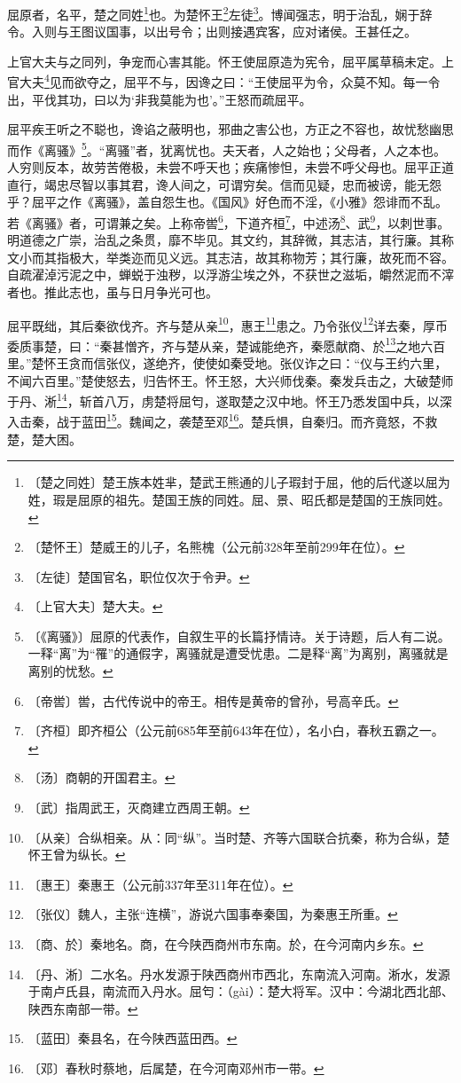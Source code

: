 \documentclass[12pt,UTF-8,openany,a4]{ctexbook}
\begin{document}
\begin{large}
    
    屈原者，名平，楚之同姓\footnote{〔楚之同姓〕\yiwen 楚王族本姓芈，楚武王熊通的儿子瑕封于屈，他的后代遂以屈为姓，瑕是屈原的祖先。楚国王族的同姓。屈、景、昭氏都是楚国的王族同姓。}也。为楚怀王\footnote{〔楚怀王〕\yiwen 楚威王的儿子，名熊槐（公元前328年至前299年在位）。}左徒\footnote{〔左徒〕\yiwen 楚国官名，职位仅次于令尹。}。博闻强志，明于治乱，娴于辞令。入则与王图议国事，以出号令；出则接遇宾客，应对诸侯。王甚任之。
    
    上官大夫与之同列，争宠而心害其能。怀王使屈原造为宪令，屈平属草稿未定。上官大夫\footnote{〔上官大夫〕\yiwen 楚大夫。}见而欲夺之，屈平不与，因谗之曰：“王使屈平为令，众莫不知。每一令出，平伐其功，曰以为‘非我莫能为也’。”王怒而疏屈平。
    
    屈平疾王听之不聪也，谗谄之蔽明也，邪曲之害公也，方正之不容也，故忧愁幽思而作《离骚》\footnote{〔《离骚》〕\yiwen 屈原的代表作，自叙生平的长篇抒情诗。关于诗题，后人有二说。一释“离”为“罹”的通假字，离骚就是遭受忧患。二是释“离”为离别，离骚就是离别的忧愁。}。“离骚”者，犹离忧也。夫天者，人之始也；父母者，人之本也。人穷则反本，故劳苦倦极，未尝不呼天也；疾痛惨怛，未尝不呼父母也。屈平正道直行，竭忠尽智以事其君，谗人间之，可谓穷矣。信而见疑，忠而被谤，能无怨乎？屈平之作《离骚》，盖自怨生也。《国风》好色而不淫，《小雅》怨诽而不乱。若《离骚》者，可谓兼之矣。上称帝喾\footnote{〔帝喾〕\yiwen 喾，古代传说中的帝王。相传是黄帝的曾孙，号高辛氏。}，下道齐桓\footnote{〔齐桓〕\yiwen 即齐桓公（公元前685年至前643年在位），名小白，春秋五霸之一。}，中述汤\footnote{〔汤〕\yiwen 商朝的开国君主。}、武\footnote{〔武〕\yiwen \yiwen 指周武王，灭商建立西周王朝。}，以刺世事。明道德之广崇，治乱之条贯，靡不毕见。其文约，其辞微，其志洁，其行廉。其称文小而其指极大，举类迩而见义远。其志洁，故其称物芳；其行廉，故死而不容。自疏濯淖污泥之中，蝉蜕于浊秽，以浮游尘埃之外，不获世之滋垢，皭然泥而不滓者也。推此志也，虽与日月争光可也。
    
    屈平既绌，其后秦欲伐齐。齐与楚从亲\footnote{〔从亲〕\yiwen 合纵相亲。从：同“纵”。当时楚、齐等六国联合抗秦，称为合纵，楚怀王曾为纵长。}，惠王\footnote{〔惠王〕\yiwen 秦惠王（公元前337年至311年在位）。}患之。乃令张仪\footnote{〔张仪〕\yiwen 魏人，主张“连横”，游说六国事奉秦国，为秦惠王所重。}详去秦，厚币委质事楚，曰：“秦甚憎齐，齐与楚从亲，楚诚能绝齐，秦愿献商、於\footnote{〔商、於〕\yiwen 秦地名。商，在今陕西商州市东南。於，在今河南内乡东。}之地六百里。”楚怀王贪而信张仪，遂绝齐，使使如秦受地。张仪诈之曰：“仪与王约六里，不闻六百里。”楚使怒去，归告怀王。怀王怒，大兴师伐秦。秦发兵击之，大破楚师于丹、淅\footnote{〔丹、淅〕\yiwen 二水名。丹水发源于陕西商州市西北，东南流入河南。淅水，发源于南卢氏县，南流而入丹水。屈匄：（gài）：楚大将军。汉中：今湖北西北部、陕西东南部一带。}，斩首八万，虏楚将屈匄，遂取楚之汉中地。怀王乃悉发国中兵，以深入击秦，战于蓝田\footnote{〔蓝田〕\yiwen 秦县名，在今陕西蓝田西。}。魏闻之，袭楚至邓\footnote{〔邓〕\yiwen 春秋时蔡地，后属楚，在今河南邓州市一带。}。楚兵惧，自秦归。而齐竟怒，不救楚，楚大困。
    

\end{large}
\end{document}
